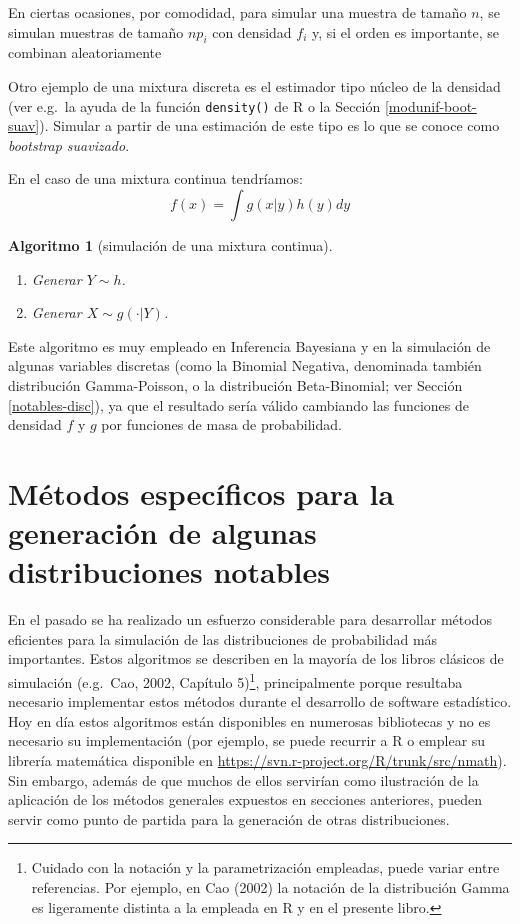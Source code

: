 \documentclass[
]{book}
\theoremstyle{break}
\newtheorem{conjecture}{Algoritmo}[chapter]
\theoremstyle{nonumberplain}
\begin{document}
En ciertas ocasiones, por comodidad, para simular una muestra de tamaño \(n\), se simulan muestras de tamaño \(np_{i}\) con densidad \(f_{i}\) y, si el orden es importante, se combinan aleatoriamente

Otro ejemplo de una mixtura discreta es el estimador tipo núcleo de la densidad (ver e.g.~la ayuda de la función \texttt{density()} de R o la Sección \ref{modunif-boot-suav}).
Simular a partir de una estimación de este tipo es lo que se conoce como \emph{bootstrap suavizado}.

En el caso de una mixtura continua tendríamos:
\[f(x)=\int g(x|y)h(y)dy\]

\begin{conjecture}[simulación de una mixtura continua]
\protect\hypertarget{cnj:mixtura-continua}{}\label{cnj:mixtura-continua}

\begin{enumerate}
\def\labelenumi{\arabic{enumi}.}
\item
  Generar \(Y\sim h\).
\item
  Generar \(X\sim g(\cdot |Y)\).
\end{enumerate}

\end{conjecture}

Este algoritmo es muy empleado en Inferencia Bayesiana y en la simulación de algunas variables discretas (como la Binomial Negativa, denominada también distribución Gamma-Poisson, o la distribución Beta-Binomial; ver Sección \ref{notables-disc}),
ya que el resultado sería válido cambiando las funciones de densidad \(f\) y \(g\) por funciones de masa de probabilidad.

\hypertarget{notables-cont}{%
\section{Métodos específicos para la generación de algunas distribuciones notables}\label{notables-cont}}

En el pasado se ha realizado un esfuerzo considerable para desarrollar métodos eficientes para la simulación de las distribuciones de probabilidad más importantes.
Estos algoritmos se describen en la mayoría de los libros clásicos de simulación (e.g.~Cao, 2002, Capítulo 5)\footnote{Cuidado con la notación y la parametrización empleadas, puede variar entre referencias. Por ejemplo, en Cao (2002) la notación de la distribución Gamma es ligeramente distinta a la empleada en R y en el presente libro.}, principalmente porque resultaba necesario implementar estos métodos durante el desarrollo de software estadístico.
Hoy en día estos algoritmos están disponibles en numerosas bibliotecas y no es necesario su implementación (por ejemplo, se puede recurrir a R o emplear su librería matemática disponible en \url{https://svn.r-project.org/R/trunk/src/nmath}).
Sin embargo, además de que muchos de ellos servirían como ilustración de la aplicación de los métodos generales expuestos en secciones anteriores, pueden servir como punto de partida para la generación de otras distribuciones.
\end{document}
